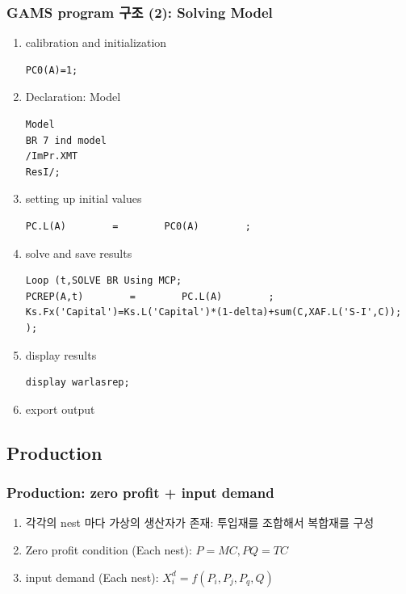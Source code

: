 \documentclass[10pt,compress,slidetop,%
			   hyperref={unicode},xcolor={svgnames},%
			   t]{beamer}
\begin{document}
\begin{frame}[fragile]
\frametitle{GAMS program 구조 (2): Solving Model}
\begin{scriptsize}
\begin{enumerate}
\item{calibration and initialization}
\begin{verbatim}
PC0(A)=1;
\end{verbatim}
\item{Declaration: Model}
\begin{verbatim}
Model
BR 7 ind model
/ImPr.XMT
ResI/;
\end{verbatim}
\item{setting up initial values}
\begin{verbatim}
PC.L(A)        =        PC0(A)        ;
\end{verbatim}
\item{solve and save results}
\begin{verbatim}
Loop (t,SOLVE BR Using MCP;
PCREP(A,t)        =        PC.L(A)        ;
Ks.Fx('Capital')=Ks.L('Capital')*(1-delta)+sum(C,XAF.L('S-I',C));
);
\end{verbatim}
\item{display results}
\begin{verbatim}
display warlasrep;
\end{verbatim}
\item{export output}
\end{enumerate}
\end{scriptsize}
\end{frame}

\subsection{Production}
\begin{frame}
\frametitle{Production: zero profit + input demand}
\bigskip
\begin{enumerate}
\item{각각의 nest 마다 가상의 생산자가 존재: 투입재를 조합해서 복합재를 구성}
\bigskip
\item{Zero profit condition (Each nest): $P=MC, PQ=TC$}
\bigskip
\item{input demand (Each nest): $X_i^d=f(P_i, P_j, P_q, Q)$}
\bigskip
\end{enumerate}
\end{frame}
\end{document}
